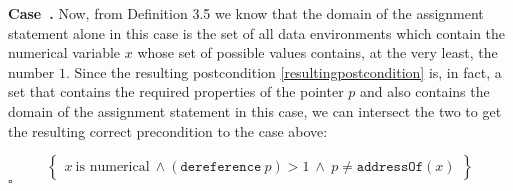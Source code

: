 \documentclass[11pt]{article}
\newcounter{case}
\newenvironment{case}[1][]{\stepcounter{case}\par\medskip\noindent
\textbf{Case~\thesection.\thecase #1} \rmfamily}{\medskip\hfill$\square$}
\newcounter{result}
\begin{document}
\begin{case}
Now, from Definition 3.5 we know that the domain of the assignment statement alone in this case is the set of all data environments which contain the numerical variable $x$ whose set of possible values contains, at the very least, the number $1$. Since the resulting postcondition \ref{resultingpostcondition} is, in fact, a set that contains the required properties of the pointer $p$ and also contains the domain of the assignment statement in this case, we can intersect the two to get the resulting correct precondition to the case above:

$$\left\{
 \begin{matrix}
x\ \text{is numerical}\ \wedge (\texttt{dereference}\ p) > 1\ \wedge\ p \neq \texttt{addressOf}(x)
\end{matrix}
\right\}$$
\end{case}
\end{document}
